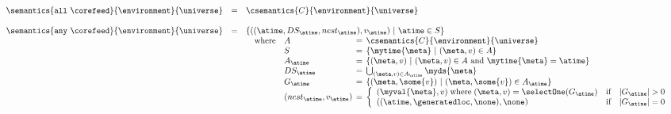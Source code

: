\begin{figure*}[t]
\[\begin{array}{lcl}
\\



\\\\

\semantics{\mathtt{all}\ \corefeed}{\environment}{\universe} 
&=& 
\csemantics{C}{\environment}{\universe}
\\\\


\semantics{\mathtt{any}\ \corefeed}{\environment}{\universe}
& = & \{ ((\atime, DS_\atime, {nest}_\atime), v_\atime)\ |\ \atime \in S\}\\
&&
\begin{array}{l}
 \begin{array}{ll@{\hspace{1ex}}c@{\hspace{1ex}}l}
 \mbox{where} & A        & = &\csemantics{C}{\environment}{\universe}\\
              & S        & = & \{\mytime{\meta}\ |\ (\meta, v) \in A\}\\
              & A_\atime & = & \{(\meta,v)\ | \ (\meta, v) \in A\ \mbox{and} \ \mytime{\meta} = \atime\}\\
              & DS_\atime & = & \bigcup_{(\meta,v) \in A_\atime} \myds{\meta} \\
              & G_\atime & = & \{(\meta,\some{v})\ | \ (\meta, \some{v}) \in A_\atime\}\\
              & ({nest}_\atime,v_\atime) & = & \left\{ \begin{array}{lll}
                                           (\myval{\meta},v)\; \mbox{where} \; (\meta,v) = \mbox{\selectOne}(G_\atime)  & \mbox{if} & |G_\atime| > 0\\
                                           ((\atime,\generatedloc,\none), \none) & \mbox{if} & |G_\atime| = 0 \\
                                           \end{array} \right.
 \end{array}
\end{array} 
\\\\


\end{array}\]
\end{figure*}
